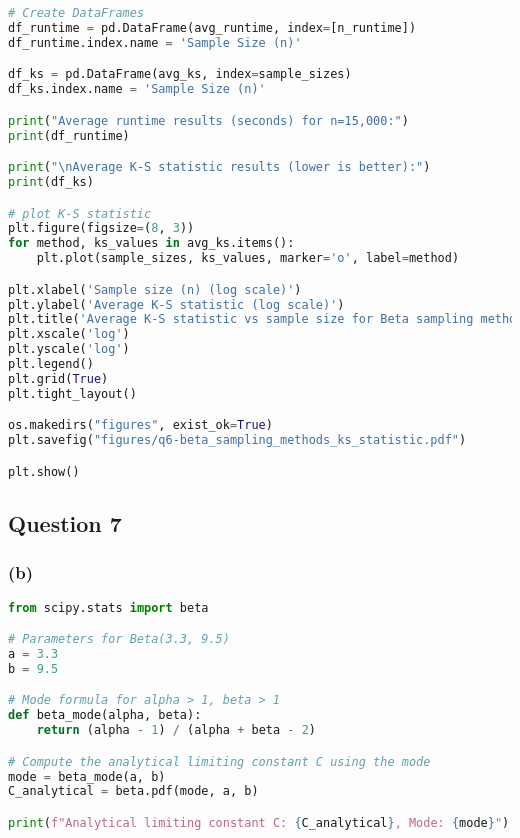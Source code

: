 \begin{lstlisting}[language=Python]
# Create DataFrames
df_runtime = pd.DataFrame(avg_runtime, index=[n_runtime])
df_runtime.index.name = 'Sample Size (n)'

df_ks = pd.DataFrame(avg_ks, index=sample_sizes)
df_ks.index.name = 'Sample Size (n)'

print("Average runtime results (seconds) for n=15,000:")
print(df_runtime)

print("\nAverage K-S statistic results (lower is better):")
print(df_ks)

# plot K-S statistic
plt.figure(figsize=(8, 3))
for method, ks_values in avg_ks.items():
    plt.plot(sample_sizes, ks_values, marker='o', label=method)

plt.xlabel('Sample size (n) (log scale)')
plt.ylabel('Average K-S statistic (log scale)')
plt.title('Average K-S statistic vs sample size for Beta sampling methods')
plt.xscale('log')
plt.yscale('log')
plt.legend()
plt.grid(True)
plt.tight_layout()

os.makedirs("figures", exist_ok=True)
plt.savefig("figures/q6-beta_sampling_methods_ks_statistic.pdf")

plt.show()
\end{lstlisting}




\newpage
\subsection{Question 7}

\subsubsection*{(b)}

\begin{lstlisting}[language=Python]
from scipy.stats import beta

# Parameters for Beta(3.3, 9.5)
a = 3.3
b = 9.5

# Mode formula for alpha > 1, beta > 1
def beta_mode(alpha, beta):
    return (alpha - 1) / (alpha + beta - 2)

# Compute the analytical limiting constant C using the mode
mode = beta_mode(a, b)
C_analytical = beta.pdf(mode, a, b)

print(f"Analytical limiting constant C: {C_analytical}, Mode: {mode}")
\end{lstlisting}



